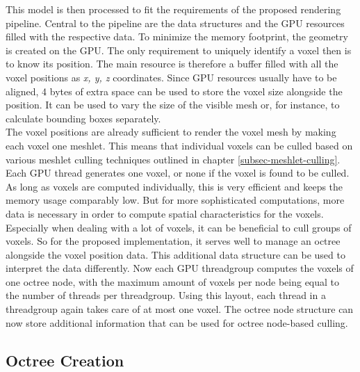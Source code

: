 \noindent
This model is then processed to fit the requirements of the proposed rendering pipeline. Central to the pipeline 
are the data structures and the \ac{GPU} resources filled with the respective data. To minimize the memory footprint,
the geometry is created on the \ac{GPU}. The only requirement to uniquely identify a voxel then is to know its position.
The main resource is therefore a buffer filled with all the voxel positions as \emph{x, y, z} coordinates. Since \ac{GPU} 
resources usually have to be aligned, 4 bytes of extra space can be used to store the voxel size alongside the position.
It can be used to vary the size of the visible mesh or, for instance, to calculate bounding boxes separately. \\

The voxel positions are already sufficient to render the voxel mesh by making each voxel one meshlet. This means that 
individual voxels can be culled based on various meshlet culling techniques outlined in chapter 
\ref{subsec-meshlet-culling}. Each \ac{GPU} thread generates one voxel, or none if the voxel is found to be culled. 
As long as voxels are computed individually, this is very efficient and keeps the memory usage comparably low. But for 
more sophisticated computations, more data is necessary in order to compute spatial characteristics for the voxels. \\

\noindent
Especially when dealing with a lot of voxels, it can be beneficial to cull groups of voxels. So for the proposed 
implementation, it serves well to manage an octree alongside the voxel position data. This additional data structure 
can be used to interpret the data differently. Now each \ac{GPU} threadgroup computes the voxels of one octree node, 
with the maximum amount of voxels per node being equal to the number of threads per threadgroup. Using this layout, 
each thread in a threadgroup again takes care of at most one voxel. The octree node structure can now store additional 
information that can be used for octree node-based culling.

\subsection*{Octree Creation} \label{subsec-octree-creation}

